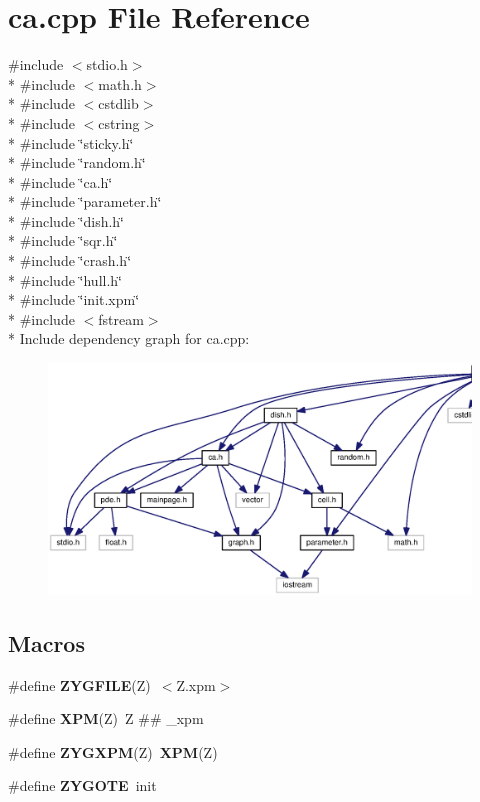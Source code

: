 \section{ca.\-cpp File Reference}
\label{ca_8cpp}
{\ttfamily \#include $<$stdio.\-h$>$}\\*
{\ttfamily \#include $<$math.\-h$>$}\\*
{\ttfamily \#include $<$cstdlib$>$}\\*
{\ttfamily \#include $<$cstring$>$}\\*
{\ttfamily \#include \char`\"{}sticky.\-h\char`\"{}}\\*
{\ttfamily \#include \char`\"{}random.\-h\char`\"{}}\\*
{\ttfamily \#include \char`\"{}ca.\-h\char`\"{}}\\*
{\ttfamily \#include \char`\"{}parameter.\-h\char`\"{}}\\*
{\ttfamily \#include \char`\"{}dish.\-h\char`\"{}}\\*
{\ttfamily \#include \char`\"{}sqr.\-h\char`\"{}}\\*
{\ttfamily \#include \char`\"{}crash.\-h\char`\"{}}\\*
{\ttfamily \#include \char`\"{}hull.\-h\char`\"{}}\\*
{\ttfamily \#include \char`\"{}init.\-xpm\char`\"{}}\\*
{\ttfamily \#include $<$fstream$>$}\\*
Include dependency graph for ca.\-cpp\-:
\nopagebreak
\begin{figure}[H]
\begin{center}
\leavevmode
\includegraphics[width=350pt]{ca_8cpp__incl}
\end{center}
\end{figure}
\subsection*{Macros}
\begin{DoxyCompactItemize}
\item 
\#define {\bf Z\-Y\-G\-F\-I\-L\-E}(Z)~$<$Z.\-xpm$>$
\item 
\#define {\bf X\-P\-M}(Z)~Z \#\# \-\_\-xpm
\item 
\#define {\bf Z\-Y\-G\-X\-P\-M}(Z)~{\bf X\-P\-M}(Z)
\item 
\#define {\bf Z\-Y\-G\-O\-T\-E}~init
\end{DoxyCompactItemize}
